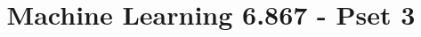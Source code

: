 \documentclass[twoside,11pt]{article}
\begin{document}
\title{Machine Learning 6.867 - Pset 3}

\maketitle


\end{document}
